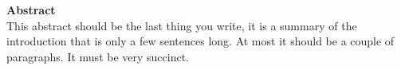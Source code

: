 \vspace*{\fill}
  \begin{center}
    \textbf{Abstract}\\
    This abstract should be the last thing you write, it is a summary of the introduction that is only a few sentences long.  At most it should be a couple of paragraphs. It must be very succinct.
  \end{center}
\vspace*{\fill}
\pagebreak